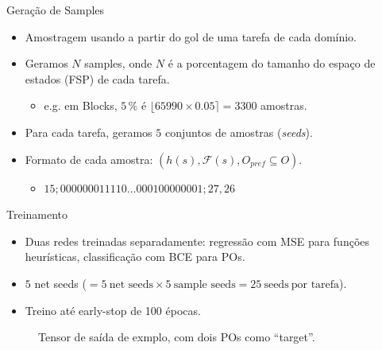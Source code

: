 \documentclass{beamer}
\begin{document}
\begin{frame}{Geração de Samples}
\begin{itemize}
  \item Amostragem usando \alert{\bfsrs} a partir do gol de uma tarefa de cada domínio.
  \pause
  \item Geramos $N$ samples, onde $N$ é a porcentagem do tamanho do espaço de estados (FSP) de cada tarefa.
    \begin{itemize}
      \item e.g. em Blocks, $5\,\%$ é $\lfloor 65990 \times 0.05 \rceil = 3300$ amostras.
    \end{itemize}
  \pause
  \item Para cada tarefa, geramos \alert{$5$} conjuntos de amostras (\emph{seeds}).
  \pause
  \item Formato de cada amostra: $(h(s), \mathcal{F}(s), O_{pref} \subseteq O)$.
    \begin{itemize}
      \item $15;000000011110\ldots000100000001;27,26$
    \end{itemize}
\end{itemize}
\end{frame}

\begin{frame}{Treinamento}
\begin{itemize}
  \item Duas redes treinadas separadamente: \alert{regressão} com MSE para funções heurísticas, \alert{classificação} com BCE para POs.
  \pause
  \item $5$ net seeds ($= 5~\text{net seeds} \times 5~\text{sample seeds} = 25~\text{seeds}~\text{por tarefa}$).
  \pause
  \item Treino até \alert{early-stop} de 100 épocas. %
\end{itemize}

\pause
\begin{figure}[tb]
\caption[]{Tensor de saída de exmplo, com dois POs como ``target''.}
\centering
{}
\label{fig:po-tensor}
\end{figure}

\end{frame}
\end{document}
